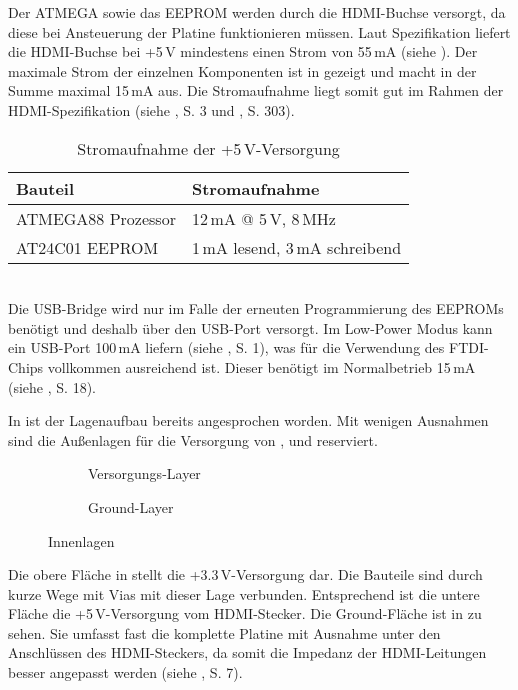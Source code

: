 Der ATMEGA sowie das EEPROM werden durch die HDMI-Buchse versorgt, da diese bei Ansteuerung der Platine funktionieren müssen. Laut Spezifikation liefert die HDMI-Buchse bei +5\,V mindestens einen Strom von 55\,mA (siehe \cite{HDMI11}). Der maximale Strom der einzelnen Komponenten ist in  gezeigt und macht in der Summe maximal 15\,mA aus. Die Stromaufnahme liegt somit gut im Rahmen der HDMI-Spezifikation (siehe \cite{Atmel2011}, S. 3 und \cite{Atmel2003}, S. 303).
\begin{table}[h]
\begin{tabular}{|p{8.5cm}|p{5cm}|}\hline
\rowcolor{TableBackgroundColor} 
   \textbf{Bauteil} & \textbf{Stromaufnahme} \\ \hline
    ATMEGA88 Prozessor & 12\,mA @ 5\,V, 8\,MHz\\ \hline
	AT24C01 EEPROM & 1\,mA lesend, 3\,mA schreibend\\ \hline
\end{tabular}
\caption{Stromaufnahme der +5\,V-Versorgung}
\label{tab:5v_strom}
\end{table} \\
Die USB-Bridge  wird nur im Falle der erneuten Programmierung des EEPROMs benötigt und deshalb über den USB-Port versorgt. Im Low-Power Modus kann ein USB-Port 100\,mA liefern (siehe \cite{USB2005}, S. 1), was für die Verwendung des FTDI-Chips vollkommen ausreichend ist. Dieser benötigt im Normalbetrieb 15\,mA (siehe \cite{FTDI2010}, S. 18).

In  ist der Lagenaufbau bereits angesprochen worden. Mit wenigen Ausnahmen sind die Außenlagen für die Versorgung von ,  und  reserviert. 
\begin{figure}[htbp]
        \centering
        \begin{subfigure}[htp]{0.48\textwidth}
                \caption{Versorgungs-Layer}
                \label{fig:teilb_vcc_layer}
        \end{subfigure}
		\quad 
        \begin{subfigure}[htp]{0.48\textwidth}
                             								\caption{Ground-Layer}
                \label{fig:teilb_gnd_layer}
        \end{subfigure}
        \caption{Innenlagen}
        \label{fig:teilb_vcc_gnd_layer}
\end{figure}
Die obere Fläche in  stellt die +3.3\,V-Versorgung dar. Die Bauteile sind durch kurze Wege mit Vias mit dieser Lage verbunden. Entsprechend ist die untere Fläche die +5\,V-Versorgung vom HDMI-Stecker. Die Ground-Fläche ist in  zu sehen. Sie umfasst fast die komplette Platine mit Ausnahme unter den Anschlüssen des HDMI-Steckers, da somit die Impedanz der HDMI-Leitungen besser angepasst werden (siehe \cite{TI2007}, S. 7). 
